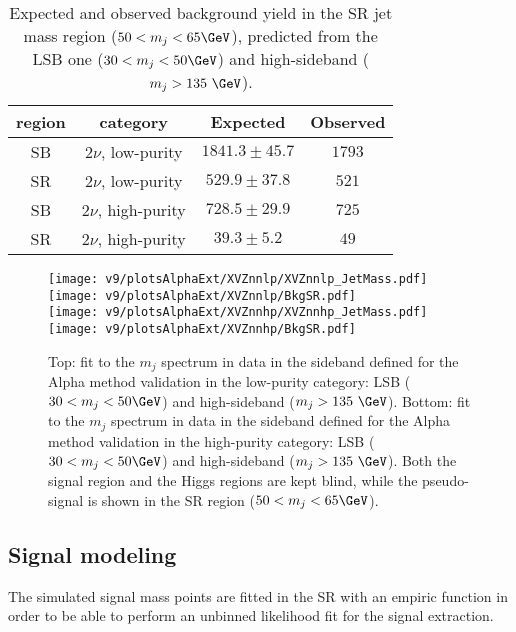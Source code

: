 \begin{table}[!htb]
  \begin{center}
    \begin{tabular}{cc|cc}
      region & category & Expected & Observed \\
      \hline
      SB & $2\nu$, low-purity & $1841.3 \pm 45.7$ & $1793$ \\
      SR & $2\nu$, low-purity & $529.9 \pm 37.8$ & $521$ \\
      \hline
      SB & $2\nu$, high-purity & $728.5 \pm 29.9$ & $725$ \\
      SR & $2\nu$, high-purity & $39.3 \pm 5.2$ & $49$ \\
      \hline
    \end{tabular}
  \end{center}
  \caption{Expected and observed background yield in the SR jet mass region ($ 50 < m_j < 65\GeV$), predicted from the LSB one ($30 < m_j < 50\GeV$) and high-sideband ($m_j > 135~\GeV$).}\label{tab:alphaClosure}
\end{table}

\begin{figure}[!htb]
  \centering
    \texttt{[image: v9/plotsAlphaExt/XVZnnlp/XVZnnlp\_JetMass.pdf]}
    \texttt{[image: v9/plotsAlphaExt/XVZnnlp/BkgSR.pdf]}%
    \\
    \texttt{[image: v9/plotsAlphaExt/XVZnnhp/XVZnnhp\_JetMass.pdf]}
    \texttt{[image: v9/plotsAlphaExt/XVZnnhp/BkgSR.pdf]}%
  \caption{Top: fit to the $m_j$ spectrum in data in the sideband defined for the Alpha method validation in the low-purity category: LSB ($30 < m_j < 50\GeV$) and high-sideband ($m_j > 135~\GeV$). Bottom: fit to the $m_j$ spectrum in data in the sideband defined for the Alpha method validation in the high-purity category: LSB ($30 < m_j < 50\GeV$) and high-sideband ($m_j > 135~\GeV$). Both the signal region and the Higgs regions are kept blind, while the pseudo-signal is shown in the SR region ($50 < m_j < 65\GeV$).}
  \label{fig:alphaClosure}
\end{figure}


\clearpage

\subsection{Signal modeling}

The simulated signal mass points are fitted in the SR with an empiric function in order to be able to perform an unbinned likelihood fit for the signal extraction. 



